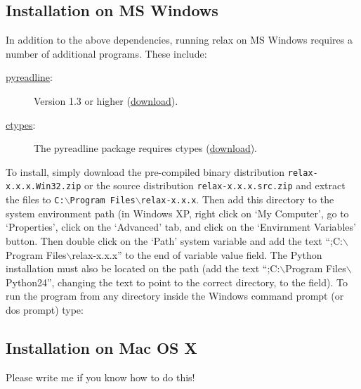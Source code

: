 \subsection{Installation on MS Windows}

In addition to the above dependencies, running relax on MS Windows requires a number of additional programs.  These include:

\begin{description}
\item[\href{http://projects.scipy.org/ipython/ipython/wiki/PyReadline/Intro}{pyreadline}:]  Version 1.3 or higher (\href{http://ipython.scipy.org/dist/pyreadline-1.3.win32.exe}{download}).
\item[\href{http://starship.python.net/crew/theller/ctypes/}{ctypes}:]  The pyreadline package requires ctypes (\href{http://prdownloads.sourceforge.net/ctypes/ctypes-1.0.0.win32-py2.4.exe?download}{download}).
\end{description}

To install, simply download the pre-compiled binary distribution \texttt{relax-x.x.x.Win32.zip} or the source distribution \texttt{relax-x.x.x.src.zip} and extract the files to \texttt{C:$\backslash$Program Files$\backslash$relax-x.x.x}.  Then add this directory to the system environment path (in Windows XP, right click on `My Computer', go to `Properties', click on the `Advanced' tab, and click on the `Envirnment Variables' button.  Then double click on the `Path' system variable and add the text ``;C:$\backslash$Program Files$\backslash$relax-x.x.x'' to the end of variable value field.  The Python installation must also be located on the path (add the text ``;C:$\backslash$Program Files$\backslash$Python24'', changing the text to point to the correct directory, to the field).  To run the program from any directory inside the Windows command prompt (or dos prompt) type:





\subsection{Installation on Mac OS X}

Please write me if you know how to do this!



